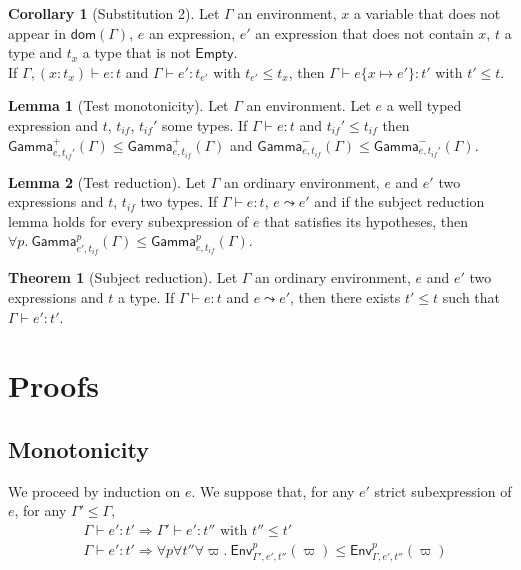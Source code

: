\documentclass[a4paper]{article}%
\newcommand{\dom}[1]{\textsf{dom}(#1)}
\newcommand{\Empty} {\textsf{Empty}}%
\newcommand{\subst}[2]{\{#1 \mapsto #2\}}
\newcommand{\Gp}[2]{\textsf{Env}^{#1}_{#2}}
\newcommand{\Genv}[3]{\textsf{Gamma}^{#1}_{#2}(#3)}
\theoremstyle{definition}
\newtheorem{theorem}{Theorem}
\newtheorem{lemma}{Lemma}
\newtheorem{corollary}{Corollary}
\begin{document}
        \begin{corollary}[Substitution 2]
          Let $\Gamma$ an environment, $x$ a variable that does not appear in $\dom \Gamma$, $e$ an expression, $e'$ an expression that does not contain $x$, $t$ a type and $t_x$ a type that is not $\Empty$.\\
          If $\Gamma, (x:t_x) \vdash e:t$ and $\Gamma \vdash e':t_{e'}$ with $t_{e'} \leq t_x$, then $\Gamma \vdash e \subst x {e'}:t'$ with $t'\leq t$.
        \end{corollary}
    
        \begin{lemma}[Test monotonicity]
          Let $\Gamma$ an environment. Let $e$ a well typed expression and $t$, $t_{if}$, $t_{if}'$ some types.
          If $\Gamma \vdash e : t$ and $t_{if}' \leq t_{if}$ then $\Genv + {e,t_{if}'} \Gamma \leq \Genv + {e,t_{if}} \Gamma$
          and $\Genv - {e,t_{if}} \Gamma \leq \Genv - {e,t_{if}'} \Gamma$.
        \end{lemma}
    
        \begin{lemma}[Test reduction]
          Let $\Gamma$ an ordinary environment, $e$ and $e'$ two expressions and $t$, $t_{if}$ two types.
          If $\Gamma \vdash e : t$, $e \leadsto e'$ and
          if the subject reduction lemma holds for every subexpression of $e$ that satisfies its hypotheses,
          then $\forall p.\ \Genv p {e',t_{if}} \Gamma \leq \Genv p {e,t_{if}} \Gamma$.
        \end{lemma}
    
        \begin{theorem}[Subject reduction]
          Let $\Gamma$ an ordinary environment, $e$ and $e'$ two expressions and $t$ a type.
          If $\Gamma \vdash e : t$ and $e \leadsto e'$, then there exists $t' \leq t$ such that $\Gamma \vdash e' : t'$.
        \end{theorem}
    
        \section{Proofs}
    
        \subsection{Monotonicity}
    
        We proceed by induction on $e$. We suppose that, for any $e'$ strict subexpression of $e$, for any $\Gamma' \leq \Gamma$,
        \begin{align*}
          &\Gamma \vdash e':t' \Rightarrow \Gamma' \vdash e':t'' \text{ with } t'' \leq t'\\
          &\Gamma \vdash e':t' \Rightarrow \forall p \forall t'' \forall \varpi.\ \Gp p {\Gamma',e',t''} (\varpi) \leq \Gp p {\Gamma,e',t''} (\varpi)
        \end{align*}
    
\end{document}
